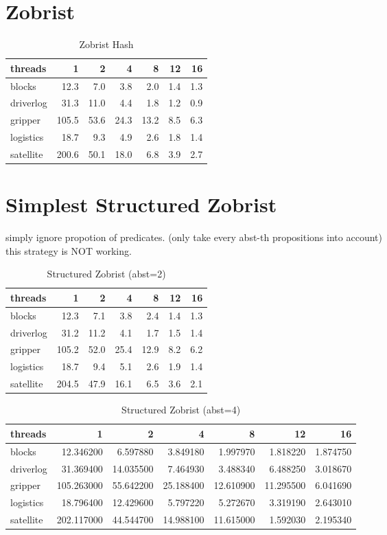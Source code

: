 \documentclass[uplatex]{article}
\begin{document}
\section{Zobrist}
\begin{table}[h]
	\caption{Zobrist Hash}
	\centering
	\begin{tabular}{lrrrrrr} \hline
		threads & 1 & 2 & 4 & 8 & 12 & 16 \\ \hline
		blocks & 12.3 & 7.0 & 3.8 & 2.0 & 1.4 & 1.3 \\
		driverlog & 31.3 & 11.0 & 4.4 & 1.8 & 1.2 & 0.9 \\
		gripper & 105.5 & 53.6 & 24.3 & 13.2 & 8.5 & 6.3 \\
		logistics & 18.7 & 9.3 & 4.9 & 2.6 & 1.8 & 1.4 \\
		satellite & 200.6 & 50.1 & 18.0 & 6.8 & 3.9 & 2.7
	\end{tabular}
\end{table}

\section{Simplest Structured Zobrist}

simply ignore propotion of predicates. (only take every abst-th propositions into account) \\
this strategy is NOT working.

\begin{table}[h]
	\caption{Structured Zobrist (abst=2)}
	\centering
	\begin{tabular}{lrrrrrr} \hline
		threads & 1 & 2 & 4 & 8 & 12 & 16 \\ \hline
		blocks & 12.3 & 7.1 & 3.8 & 2.4 & 1.4 & 1.3 \\
		driverlog & 31.2 & 11.2 & 4.1 & 1.7 & 1.5 & 1.4 \\
		gripper & 105.2 & 52.0 & 25.4 & 12.9 & 8.2 & 6.2 \\
		logistics & 18.7 & 9.4 & 5.1 & 2.6 & 1.9 & 1.4 \\
		satellite & 204.5 & 47.9 & 16.1 & 6.5 & 3.6 & 2.1
	\end{tabular}
\end{table}

\begin{table}[h]
	\caption{Structured Zobrist (abst=4)}
	\centering
	\begin{tabular}{lrrrrrr} \hline
		threads & 1 & 2 & 4 & 8 & 12 & 16 \\ \hline
		blocks & 12.346200 & 6.597880 & 3.849180 & 1.997970 & 1.818220 & 1.874750 \\
		driverlog & 31.369400 & 14.035500 & 7.464930 & 3.488340 & 6.488250 & 3.018670 \\
		gripper & 105.263000 & 55.642200 & 25.188400 & 12.610900 & 11.295500 & 6.041690 \\
		logistics & 18.796400 & 12.429600 & 5.797220 & 5.272670 & 3.319190 & 2.643010 \\
		satellite & 202.117000 & 44.544700 & 14.988100 & 11.615000 & 1.592030 & 2.195340
	\end{tabular}
\end{table}
\end{document}
